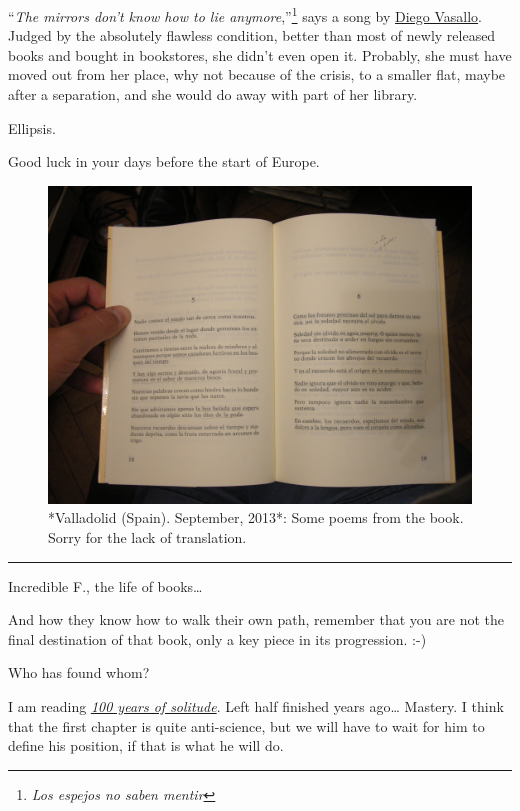 \documentclass[]{book}
\let\rmarkdownfootnote\footnote%
\def\footnote{\protect\rmarkdownfootnote}
\begin{document}
``\emph{The mirrors don't know how to lie anymore},''\footnote{\emph{Los espejos no saben mentir}} says a song by \href{https://es.wikipedia.org/wiki/Diego_Vasallo}{Diego Vasallo}. Judged by the absolutely flawless condition, better than most of newly released books and bought in bookstores, she didn't even open it. Probably, she must have moved out from her place, why not because of the crisis, to a smaller flat, maybe after a separation, and she would do away with part of her library.

Ellipsis.

Good luck in your days before the start of Europe.

\begin{figure}

{\centering \includegraphics[width=0.75\linewidth]{images/2013/poemas} 

}

\caption{*Valladolid (Spain). September, 2013*: Some poems from the book. Sorry for the lack of translation.}\label{fig:poemas}
\end{figure}

\begin{center}\rule{0.5\linewidth}{\linethickness}\end{center}

Incredible F., the life of books\ldots{}

And how they know how to walk their own path, remember that you are not the final destination of that book, only a key piece in its progression. :-)

Who has found whom?

I am reading \href{https://en.wikipedia.org/wiki/One_Hundred_Years_of_Solitude}{\emph{100 years of solitude}}. Left half finished years ago\ldots{} Mastery. I think that the first chapter is quite anti-science, but we will have to wait for him to define his position, if that is what he will do.
\end{document}

